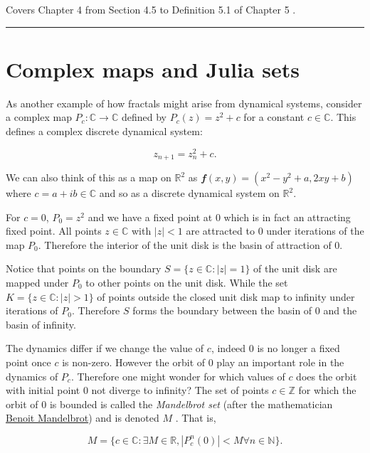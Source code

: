 \documentclass[
  a4paper,
  oneside,
  final]{krantz}
\newcommand{\C}{\mathbb{C}}
\newcommand{\R}{\mathbb{R}}
\newcommand{\Z}{\mathbb{Z}}
\newcommand{\N}{\mathbb{N}}
\renewcommand{\v}[1]{{\mathbfit{#1}}}
\theoremstyle{definition}
\theoremstyle{definition}
\theoremstyle{definition}
\theoremstyle{definition}
\theoremstyle{remark}
\begin{document}
Covers Chapter 4 from Section 4.5 to Definition 5.1 of Chapter 5 \citep{ASY}.

\begin{center}\rule{0.5\linewidth}{0.5pt}\end{center}

\hypertarget{complexmapsandJuliasets}{%
\section{Complex maps and Julia sets}\label{complexmapsandJuliasets}}

As another example of how fractals might arise from dynamical systems, consider a complex map \(P_{c}: \C \to \C\) defined by \(P_{c}(z) = z^2 + c\) for a constant \(c \in \C\). This defines a complex discrete dynamical system:

\[z_{n+1} = z_n^2 + c.\]

We can also think of this as a map on \(\R^2\) as \(\v{f}(x,y)= (x^2 -y^2 + a, 2xy + b)\) where \(c = a + ib \in \C\) and so as a discrete dynamical system on \(\R^2\).

For \(c = 0\), \(P_{0} = z^2\) and we have a fixed point at \(0\) which is in fact an attracting fixed point. All points \(z \in \C\) with \(|z|<1\) are attracted to \(0\) under iterations of the map \(P_{0}\). Therefore the interior of the unit disk is the basin of attraction of \(0\).

Notice that points on the boundary \(S = \{ z \in \C : |z| = 1 \}\) of the unit disk are mapped under \(P_{0}\) to other points on the unit disk. While the set \(K = \{ z \in \C : |z|>1 \}\) of points outside the closed unit disk map to infinity under iterations of \(P_{0}\). Therefore \(S\) forms the boundary between the basin of \(0\) and the basin of infinity.

The dynamics differ if we change the value of \(c\), indeed \(0\) is no longer a fixed point once \(c\) is non-zero. However the orbit of \(0\) play an important role in the dynamics of \(P_{c}\). Therefore one might wonder for which values of \(c\) does the orbit with initial point \(0\) not diverge to infinity? The set of points \(c \in \Z\) for which the orbit of \(0\) is bounded is called the \emph{Mandelbrot set} (after the mathematician \href{https:mathshistory.st-andrews.ac.uk/Biographies/Mandelbrot}{Benoit Mandelbrot}) and is denoted \(M\) . That is,

\[ M = \{ c \in \C: \exists M \in \R, |P_{c}^{n}(0)|< M \forall n \in \N \}.\]
\end{document}
